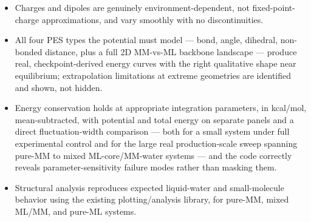 \documentclass[11pt]{article}
\begin{document}
\begin{itemize}
  \item Charges and dipoles are genuinely environment-dependent, not fixed-point-charge
        approximations, and vary smoothly with no discontinuities.
  \item All four PES types the potential must model --- bond, angle, dihedral, non-bonded
        distance, plus a full 2D MM-vs-ML backbone landscape --- produce real,
        checkpoint-derived energy curves with the right qualitative shape near equilibrium;
        extrapolation limitations at extreme geometries are identified and shown, not hidden.
  \item Energy conservation holds at appropriate integration parameters, in kcal/mol,
        mean-subtracted, with potential and total energy on separate panels and a direct
        fluctuation-width comparison --- both for a small system under full experimental
        control and for the large real production-scale sweep spanning pure-MM to mixed
        ML-core/MM-water systems --- and the code correctly reveals parameter-sensitivity
        failure modes rather than masking them.
  \item Structural analysis reproduces expected liquid-water and small-molecule behavior
        using the existing plotting/analysis library, for pure-MM, mixed ML/MM, and pure-ML
        systems.
\end{itemize}
\end{document}

